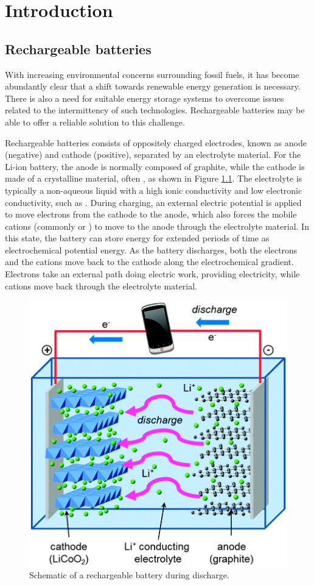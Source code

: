 \documentclass[12pt]{report}
\begin{document}
\chapter{Introduction}


\section{Rechargeable batteries}

With increasing environmental concerns surrounding fossil fuels, it has become abundantly clear that a shift towards renewable energy generation is necessary.\cite{chu2017, chu2012}
There is also a need for suitable energy storage systems to overcome issues related to the intermittency of such technologies. 
Rechargeable batteries may be able to offer a reliable solution to this challenge.\cite{islam2014, liu2013, dunn2011, goodenough2010, armand2008}

Rechargeable batteries consists of oppositely charged electrodes, known as anode (negative) and cathode (positive), separated by an electrolyte material.
For the Li-ion battery, the anode is normally composed of graphite, while the cathode is made of a crystalline material, often , as shown in Figure \ref{battery}.
The electrolyte is typically a non-aqueous liquid with a high ionic conductivity and low electronic conductivity, such as .
During charging, an external electric potential is applied to move electrons from the cathode to the anode, which also forces the mobile cations (commonly  or ) to move to the anode through the electrolyte material.
In this state, the battery can store energy for extended periods of time as electrochemical potential energy.
As the battery discharges, both the electrons and the cations move back to the cathode along the electrochemical gradient.
Electrons take an external path doing electric work, providing electricity, while cations move back through the electrolyte material.\cite{islam2014}

\begin{figure}[!ht]
\centering
\includegraphics[width=8 cm]{./figures/battery.png}
\caption{Schematic of a rechargeable battery during discharge.\cite{islam2014}}
\label{battery}
\end{figure}
\end{document}
